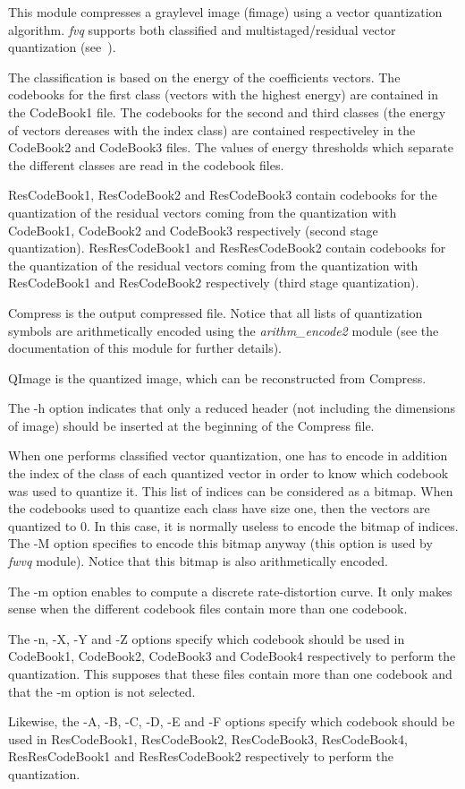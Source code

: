 This module compresses a graylevel image (fimage) using a vector quantization 
algorithm. {\em fvq} supports both classified and multistaged/residual 
vector quantization (see~\cite{gersho.gray:vector}).

The classification is based on the energy of the coefficients vectors. 
The codebooks for the first class (vectors with the highest energy) 
are contained in the CodeBook1 file.  The codebooks for the second and third 
classes (the energy of vectors dereases with the index class) 
are contained respectiveley in the CodeBook2 and CodeBook3 files. 
The values of energy thresholds which separate the different classes 
are read in the codebook files. 

ResCodeBook1, ResCodeBook2 and ResCodeBook3 contain codebooks 
for the quantization of the residual vectors coming from the 
quantization with CodeBook1, CodeBook2 and CodeBook3 respectively 
(second stage quantization). 
ResResCodeBook1 and ResResCodeBook2 contain codebooks 
for the quantization of the residual vectors coming from the 
quantization with ResCodeBook1 and ResCodeBook2 respectively 
(third stage quantization). 

Compress is the output compressed file. Notice that all lists 
of quantization symbols are arithmetically encoded using the 
{\em arithm\_encode2} module (see the documentation of this module 
for further details). 

QImage is the quantized image, which can be reconstructed 
from Compress. 

The -h option indicates that only a reduced header (not including 
the dimensions of image) should be inserted at the beginning 
of the Compress file. 

When one performs classified vector quantization, one has to encode 
in addition the index of the class of each quantized vector in order 
to know which codebook was used to quantize it. This list of indices 
can be considered as a bitmap. When the codebooks used to quantize each class 
have size one, then the vectors are quantized to 0. In this case, it is 
normally useless to encode the bitmap of indices. The -M option 
specifies to encode this bitmap anyway (this option is used by {\em fwvq} 
module). Notice that this bitmap is also arithmetically encoded. 

The -m option enables to compute a discrete rate-distortion curve. 
It only makes sense when the different codebook files contain more 
than one codebook.

The -n, -X, -Y and -Z options specify which codebook should be used 
in CodeBook1, CodeBook2, CodeBook3 and CodeBook4 respectively 
to perform the quantization. This supposes that these files contain 
more than one codebook and that the -m option is not selected.   

Likewise, the -A, -B, -C, -D, -E and -F options specify which codebook 
should be used in ResCodeBook1, ResCodeBook2, ResCodeBook3, ResCodeBook4, 
ResResCodeBook1 and ResResCodeBook2 respectively 
to perform the quantization. 

